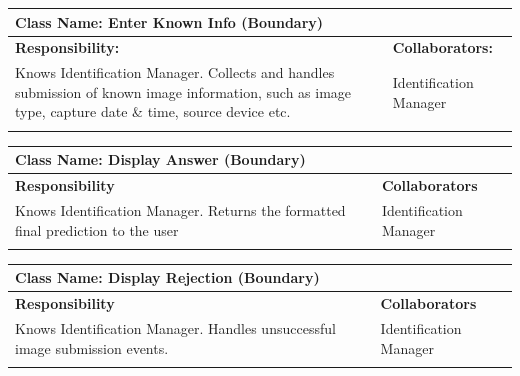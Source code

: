 \documentclass[]{article}
\begin{document}
	\begin{table}[H]
		\centering
		\begin{tabular}{|p{8cm}|p{8cm}|}
		\hline 
		 \multicolumn{2}{|l|}{\textbf{Class Name:} Enter Known Info (Boundary)} \\
		\hline
		\textbf{Responsibility:} & \textbf{Collaborators:} \\
		\hline
		Knows Identification Manager. \newline Collects and handles submission of known image information, such as image type, capture date \& time, source device etc. & Identification Manager \\
		\vspace{1in} & \\
		\hline 
		\end{tabular}
	\end{table}

	\begin{table}[H]
		\centering
		\begin{tabular}{|p{8cm}|p{8cm}|}
		\hline
		\multicolumn{2}{|l|}{\textbf{Class Name:} Display Answer (Boundary)} \\
		\hline
		\textbf{Responsibility} & \textbf{Collaborators} \\
		\hline
		Knows Identification Manager. \newline Returns the formatted final prediction to the user & Identification Manager \\
		\vspace{1in} & \\
		\hline
		\end{tabular}
	\end{table}

	\begin{table}[H]
		\centering
		\begin{tabular}{|p{8cm}|p{8cm}|}
		\hline
		\multicolumn{2}{|l|}{\textbf{Class Name:} Display Rejection (Boundary)} \\
		\hline
		\textbf{Responsibility} & \textbf{Collaborators} \\
		\hline
		Knows Identification Manager. \newline Handles unsuccessful image submission events. & Identification Manager \\
		\vspace{1in} & \\
		\hline
		\end{tabular}
	\end{table}
\end{document}
